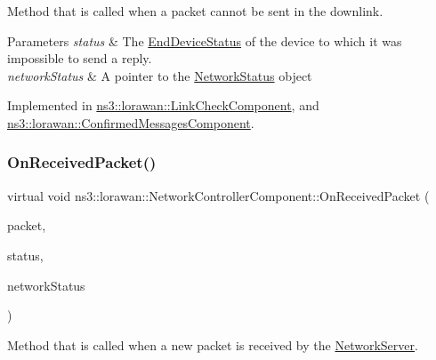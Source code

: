 Method that is called when a packet cannot be sent in the downlink.


\begin{DoxyParams}{Parameters}
{\em status} & The \hyperlink{classns3_1_1lorawan_1_1EndDeviceStatus}{End\+Device\+Status} of the device to which it was impossible to send a reply. \\
\hline
{\em network\+Status} & A pointer to the \hyperlink{classns3_1_1lorawan_1_1NetworkStatus}{Network\+Status} object \\
\hline
\end{DoxyParams}


Implemented in \hyperlink{classns3_1_1lorawan_1_1LinkCheckComponent_a256519f7da4d9d512ac1c1ce6bde4c1a}{ns3\+::lorawan\+::\+Link\+Check\+Component}, and \hyperlink{classns3_1_1lorawan_1_1ConfirmedMessagesComponent_ae048f3d5aff4da319d113c213701ef73}{ns3\+::lorawan\+::\+Confirmed\+Messages\+Component}.

\mbox{\label{classns3_1_1lorawan_1_1NetworkControllerComponent_a965fb667c3e88703e8cdbcbcd057db6f}} 
\subsubsection{\texorpdfstring{On\+Received\+Packet()}{OnReceivedPacket()}}
{\footnotesize\ttfamily virtual void ns3\+::lorawan\+::\+Network\+Controller\+Component\+::\+On\+Received\+Packet (\begin{DoxyParamCaption}\item[{Ptr$<$ const Packet $>$}]{packet,  }\item[{Ptr$<$ \hyperlink{classns3_1_1lorawan_1_1EndDeviceStatus}{End\+Device\+Status} $>$}]{status,  }\item[{Ptr$<$ \hyperlink{classns3_1_1lorawan_1_1NetworkStatus}{Network\+Status} $>$}]{network\+Status }\end{DoxyParamCaption})\hspace{0.3cm}{\ttfamily [pure virtual]}}

Method that is called when a new packet is received by the \hyperlink{classns3_1_1lorawan_1_1NetworkServer}{Network\+Server}.


